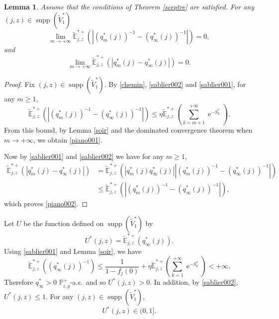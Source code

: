 \documentclass[12pt]{amsart}
\newtheorem{lemma}[theorem]{Lemma}
\theoremstyle{definition}
\numberwithin{equation}{section}
\newcommand*{\abs}[1]{\left\lvert#1\right\rvert}
\def\bb#1{\mathbb{#1}}
\def\tt#1{\tilde{#1}}
\def\tbb#1{\tilde{\mathbb{#1}}}
\def\geq{\geqslant}
\def\leq{\leqslant}
\DeclareMathOperator{\e}{e}
\DeclareMathOperator{\supp}{supp}
\begin{document}
\begin{lemma} Assume that the conditions of Theorem \ref{sceptre} are satisfied.
\label{piano}
For any $(j,z) \in \supp (\tt V_1^*)$
\begin{equation}
\label{piano001}
\lim_{m\to+\infty} \tbb E_{j,z}^{*+} \left( \abs{\left(q_m^*(j)\right)^{-1} - \left(q_{\infty}^*(j)\right)^{-1}} \right) = 0,
\end{equation}
and
\begin{equation}
\label{piano002}
\lim_{m\to+\infty} \tbb E_{j,z}^{*+} \left( \abs{q_m^*(j) - q_{\infty}^*(j)} \right) = 0.
\end{equation}
\end{lemma}

\begin{proof}
Fix $(j,z) \in \supp(\tt V_1^*)$. By \eqref{chemin}, \eqref{sablier002} and \eqref{sablier001}, for any $m \geq 1$,
\[
\tbb E_{j,z}^{*+} \left( \abs{\left(q_m^*(j)\right)^{-1} - \left(q_{\infty}^*(j)\right)^{-1}} \right) \leq \eta \tbb E_{j,z}^{*+} \left( \sum_{k=m+1}^{+\infty} \e^{-S_k^*} \right).
\]
 From this bound, by Lemma \ref{soir} and the dominated convergence theorem when $m\to+\infty$, we obtain \eqref{piano001}.

Now by \eqref{sablier001} and \eqref{sablier002} we have for any $m\geq 1$,
\begin{align*}
	\tbb E_{j,z}^{*+} \left( \abs{q_m^*(j) - q_{\infty}^*(j)} \right) &= \tbb E_{j,z}^{*+} \left( \abs{q_m^*(j) q_{\infty}^*(j)} \abs{\left(q_m^*(j)\right)^{-1} - \left(q_{\infty}^*(j)\right)^{-1}} \right) \\
	&\leq \tbb E_{j,z}^{*+} \left( \abs{\left(q_m^*(j)\right)^{-1} - \left(q_{\infty}^*(j)\right)^{-1}} \right),
\end{align*}
which proves \eqref{piano002}.
\end{proof}

Let $U$ be the function defined on $\supp(\tt V_1^*)$ by
\[
U^*(j,z) = \tbb E_{j,z}^{*+} \left( q_{\infty}^*(j) \right).
\]
Using \eqref{sablier001} and Lemma \ref{soir}, we have
\begin{equation}
	\label{panda}
	\tbb E_{j,z}^{*+} \left( \left(q_{\infty}^*(j)\right)^{-1} \right) \leq \frac{1}{1-f_j(0)} +\eta \tbb E_{j,z}^{*+} \left( \sum_{k=1}^{+\infty} \e^{-S_k^*} \right) <+\infty.
\end{equation}
Therefore $q_{\infty}^* > 0$ $\bb P_{i,y}^+$-a.s.\ and so $U^*(j,z) > 0$. In addition, by \eqref{sablier002}, $U^*(j,z) \leq 1$. For any $(j,z) \in \supp(\tt V_1^*)$,
\begin{equation}
	\label{eventail}
	U^*(j,z) \in (0,1].
\end{equation}
\end{document}

